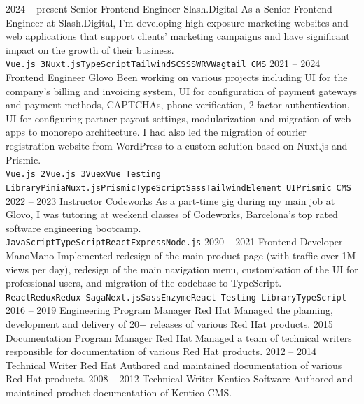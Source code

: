 \documentclass[9pt]{developercv}
\begin{document}

\begin{entrylist}
  \entry
  {2024 --  present}
  {Senior Frontend Engineer}
  {Slash.Digital}
  {As a Senior Frontend Engineer at Slash.Digital, I'm developing high-exposure marketing websites and web applications that support clients' marketing campaigns and have significant impact on the growth of their business.\\ \texttt{Vue.js 3}\slashsep\texttt{Nuxt.js}\slashsep\texttt{TypeScript}\slashsep\texttt{Tailwind}\slashsep\texttt{SCSS}\slashsep\texttt{SWRV}\slashsep\texttt{Wagtail CMS}}
  \entry
  {2021 --  2024}
  {Frontend Engineer}
  {Glovo}
  {Been working on various projects including UI for the company's billing and invoicing system, UI for configuration of payment gateways and payment methods, CAPTCHAs, phone verification, 2-factor authentication, UI for configuring partner payout settings, modularization and migration of web apps to monorepo architecture. I had also led the migration of courier registration website from WordPress to a custom solution based on Nuxt.js and Prismic.\\ \texttt{Vue.js 2}\slashsep\texttt{Vue.js 3}\slashsep\texttt{Vuex}\slashsep\texttt{Vue Testing Library}\slashsep\texttt{Pinia}\slashsep\texttt{Nuxt.js}\slashsep\texttt{Prismic}\slashsep\texttt{TypeScript}\slashsep\texttt{Sass}\slashsep\texttt{Tailwind}\slashsep\texttt{Element UI}\slashsep\texttt{Prismic CMS}}
  \entry
  {2022 --  2023}
  {Instructor}
  {Codeworks}
  {As a part-time gig during my main job at Glovo, I was tutoring at weekend classes of Codeworks, Barcelona’s top rated software engineering bootcamp.\\ \texttt{JavaScript}\slashsep\texttt{TypeScript}\slashsep\texttt{React}\slashsep\texttt{Express}\slashsep\texttt{Node.js}}
  \entry
  {2020 -- 2021}
  {Frontend Developer}
  {ManoMano}
  {Implemented redesign of the main product page (with traffic over 1M views per day), redesign of the main navigation menu, customisation of the UI for professional users, and migration of the codebase to TypeScript.\\ \texttt{React}\slashsep\texttt{Redux}\slashsep\texttt{Redux Saga}\slashsep\texttt{Next.js}\slashsep\texttt{Sass}\slashsep\texttt{Enzyme}\slashsep\texttt{React Testing Library}\slashsep\texttt{TypeScript}}
  \entry
  {2016 -- 2019}
  {Engineering Program Manager}
  {Red Hat}
  {Managed the planning, development and delivery of 20+ releases of various Red Hat products. }
  \entry
  {2015}
  {Documentation Program Manager}
  {Red Hat}
  {Managed a team of technical writers responsible for documentation of various Red Hat products. }
  \entry
  {2012 -- 2014}
  {Technical Writer}
  {Red Hat}
  {Authored and maintained documentation of various Red Hat products. }
  \entry
  {2008 -- 2012}
  {Technical Writer}
  {Kentico Software}
  {Authored and maintained product documentation of Kentico CMS. }
\end{entrylist}
\end{document}
